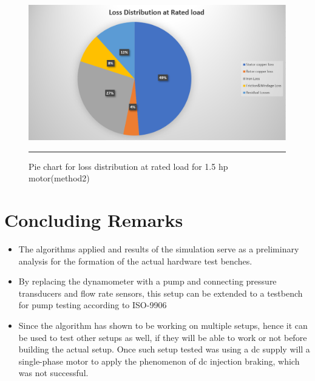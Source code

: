 \begin{figure}[hbtp!]
	\centering
		\includegraphics[width = 4.5in]{./Figures/MS/fig522.png}
		\rule{35em}{0.5pt}
	\caption{Pie chart for loss distribution at rated load for 1.5 hp motor(method2)}
	\label{fig:Pie chart for loss distribution at rated load for 1.5 hp motor(method2)} 
\end{figure}

\clearpage
\section{Concluding Remarks}
\begin{itemize}
    \item The algorithms applied and results of the simulation serve as a preliminary analysis for the formation of the actual hardware test benches. 
    \item By replacing the dynamometer with a pump and connecting pressure transducers and flow rate sensors, this setup can be extended to a testbench for pump testing according to ISO-9906
    \item Since the algorithm has shown to be working on multiple setups, hence it can be used to test other setups as well, if they will be able to work or not before building the actual setup. Once such setup tested was using a dc supply will a single-phase motor to apply the phenomenon of dc injection braking, which was not successful.
\end{itemize}


